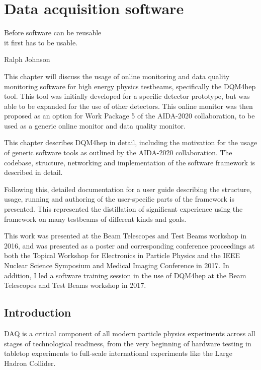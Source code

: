 \chapter{Data acquisition software}
\label{chapter:dqm4hep}

\epigraph{Before software can be reusable \\it first has to be usable.}{Ralph Johnson}

This chapter will discuss the usage of online monitoring and data quality monitoring software for high energy physics testbeams, specifically the \acrshort{DQM4hep} tool. This tool was initially developed for a specific detector prototype, but was able to be expanded for the use of other detectors. This online monitor was then proposed as an option for Work Package 5 of the AIDA-2020 collaboration, to be used as a generic online monitor and data quality monitor.

This chapter describes \acrshort{DQM4hep} in detail, including the motivation for the usage of generic software tools as outlined by the AIDA-2020 collaboration. The codebase, structure, networking and implementation of the software framework is described in detail.

Following this, detailed documentation for a user guide describing the structure, usage, running and authoring of the user-specific parts of the framework is presented. This represented the distillation of significant experience using the framework on many testbeams of different kinds and goals.

This work was presented at the Beam Telescopes and Test Beams workshop in 2016, and was presented as a poster and corresponding conference proceedings at both the Topical Workshop for Electronics in Particle Physics\cite{dqm4hep-twepp} and the \acrshort{IEEE} Nuclear Science Symposium and Medical Imaging Conference\cite{dqm4hep-ieee} in 2017. In addition, I led a software training session in the use of \acrshort{DQM4hep} at the Beam Telescopes and Test Beams workshop in 2017. %

\section{Introduction}
\acrfull{DAQ} is a critical component of all modern particle physics experiments across all stages of technological readiness, from the very beginning of hardware testing in tabletop experiments to full-scale international experiments like the Large Hadron Collider.

